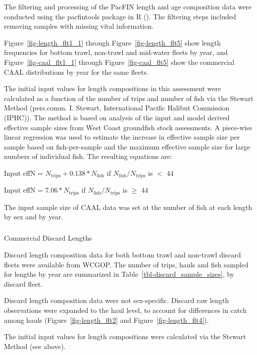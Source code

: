 \documentclass[
]{scrartcl}
\makeatletter
\let\oldsubparagraph\subparagraph
\renewcommand{\subparagraph}{
    \@ifstar
      \xxxSubParagraphStar
      \xxxSubParagraphNoStar
  }
\newcommand{\xxxSubParagraphStar}[1]{\oldsubparagraph*{#1}\mbox{}}
\newcommand{\xxxSubParagraphNoStar}[1]{\oldsubparagraph{#1}\mbox{}}
\makeatother
\begin{document}
The filtering and processing of the PacFIN length and age composition
data were conducted using the \gls{pacfintools} package in R
(). The filtering steps included removing samples with missing vital
information.

Figure~\ref{fig-length_flt1_1} through Figure~\ref{fig-length_flt5} show
length frequencies for bottom trawl, non-trawl and mid-water fleets by
year, and Figure~\ref{fig-caal_flt1_1} through
Figure~\ref{fig-caal_flt5} show the commercial CAAL distributions by
year for the same fleets.

The initial input values for length compositions in this assessment were
calculated as a function of the number of trips and number of fish via
the Stewart Method (pers.comm. I. Stewart, International Pacific Halibut
Commission (IPHC)). The method is based on analysis of the input and
model derived effective sample sizes from West Coast groundfish stock
assessments. A piece-wise linear regression was used to estimate the
increase in effective sample size per sample based on fish-per-sample
and the maximum effective sample size for large numbers of individual
fish. The resulting equations are:

\begin{centering}

Input effN = $N_{\text{trips}} + 0.138 * N_{\text{fish}}$ if $N_{\text{fish}}/N_{\text{trips}}$ is $<$ 44

Input effN = $7.06 * N_{\text{trips}}$ if $N_{\text{fish}}/N_{\text{trips}}$ is $\geq$ 44

\end{centering}

The input sample size of CAAL data was set at the number of fish at each
length by sex and by year.

\subparagraph{Commercial Discard
Lengths}\label{commercial-discard-lengths}

Discard length composition data for both bottom trawl and non-trawl
discard fleets were available from WCGOP. The number of trips, hauls and
fish sampled for lengths by year are summarized in
Table~\ref{tbl-discard_sample_sizes}, by discard fleet.

Discard length composition data were not sex-specific. Discard raw
length observations were expanded to the haul level, to account for
differences in catch among hauls (Figure~\ref{fig-length_flt2} and
Figure~\ref{fig-length_flt4}).

The initial input values for length compositions were calculated via the
Stewart Method (see above).
\end{document}

